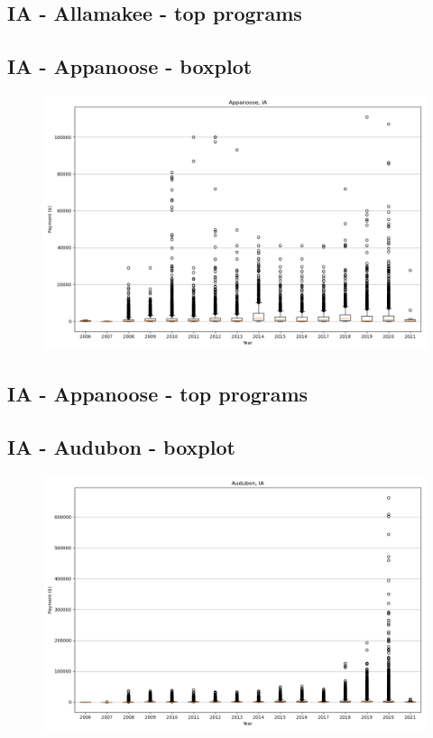 \subsection*{IA - Allamakee - top programs}

\newpage
\subsection*{IA - Appanoose - boxplot}
\begin{figure}[h]
\centering
\includegraphics[width=7in]{../output/boxplots/counties/Appanoose-IA_boxplot.png}
\end{figure}


\subsection*{IA - Appanoose - top programs}

\newpage
\subsection*{IA - Audubon - boxplot}
\begin{figure}[h]
\centering
\includegraphics[width=7in]{../output/boxplots/counties/Audubon-IA_boxplot.png}
\end{figure}


